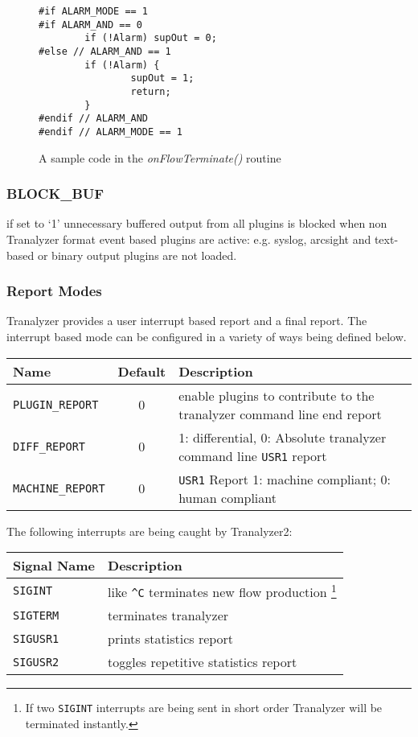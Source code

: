 \begin{figure}[ht]
\centering
\begin{lstlisting}
#if ALARM_MODE == 1
#if ALARM_AND == 0
        if (!Alarm) supOut = 0;
#else // ALARM_AND == 1
        if (!Alarm) {
                supOut = 1;
                return;
        }
#endif // ALARM_AND
#endif // ALARM_MODE == 1
\end{lstlisting}
\caption{A sample code in the {\em onFlowTerminate()} routine}
\end{figure}


\subsubsection{BLOCK\_BUF}
if set to `1' unnecessary buffered output from all plugins is blocked when non Tranalyzer format event based plugins are active: e.g. syslog, arcsight and
text-based or binary output plugins are not loaded.

\subsubsection{Report Modes}
Tranalyzer provides a user interrupt based report and a final report. The interrupt based mode can be configured in a variety of ways being defined below.

\begin{longtable}{lcl}
    \toprule
    {\bf Name} & {\bf Default} & {\bf Description}\\
    \midrule\endhead%
    {\tt PLUGIN\_REPORT} & 0 & enable plugins to contribute to the tranalyzer command line end report \\
    {\tt DIFF\_REPORT} & 0 & 1: differential, 0: Absolute tranalyzer command line {\tt USR1} report \\
    {\tt MACHINE\_REPORT} & 0 & {\tt USR1} Report 1: machine compliant; 0: human compliant \\
    \bottomrule
\end{longtable}

The following interrupts are being caught by Tranalyzer2:

\begin{longtable}{ll}
    \toprule
    {\bf Signal Name} & {\bf Description}\\
    \midrule\endhead%
    {\tt SIGINT}  & like {\tt\textasciicircum{}C} terminates new flow production%
                    \footnote{If two {\tt SIGINT} interrupts are being sent in short order Tranalyzer will be terminated instantly.}\\
    {\tt SIGTERM} & terminates tranalyzer \\
    {\tt SIGUSR1} & prints statistics report \\
    {\tt SIGUSR2} & toggles repetitive statistics report \\
    \bottomrule
\end{longtable}

